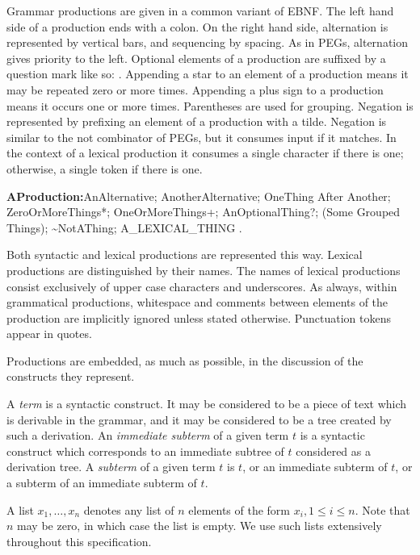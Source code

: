 \documentclass{article}
\begin{document}
\LMHash{}
Grammar productions are given in a common variant of EBNF.
The left hand side of a production ends with a colon.
On the right hand side, alternation is represented by vertical bars, and sequencing by spacing.
As in PEGs, alternation gives priority to the left.
Optional elements of a production are suffixed by a question mark like so: .
Appending a star to an element of a production means it may be repeated zero or more times.
Appending a plus sign to a production means it occurs one or more times.
Parentheses are used for grouping.
Negation is represented by prefixing an element of a production with a tilde.
Negation is similar to the not combinator of PEGs, but it consumes input if it matches.
In the context of a lexical production it consumes a single character if there is one; otherwise, a single token if there is one.


\begin{grammar}
{\sf
{\bf AProduction:}AnAlternative;
  AnotherAlternative;
  OneThing After Another;
  ZeroOrMoreThings*;
  OneOrMoreThings+;
  AnOptionalThing?;
  (Some Grouped Things);
  \~{}NotAThing;
  A\_LEXICAL\_THING
  .
}
\end{grammar}

\LMHash{}
Both syntactic and lexical productions are represented this way.
Lexical productions are distinguished by their names.
The names of lexical productions consist exclusively of upper case characters and underscores.
As always, within grammatical productions, whitespace and comments between elements of the production are implicitly ignored unless stated otherwise.
Punctuation tokens appear in quotes.

\LMHash{}
Productions are embedded, as much as possible, in the discussion of the constructs they represent.

\LMHash{}
A {\em term} is a syntactic construct.
It may be considered to be a piece of text which is derivable in the grammar,
and it may be considered to be a tree created by such a derivation.
An {\em immediate subterm} of a given term $t$ is a syntactic construct
which corresponds to an immediate subtree of $t$ considered as a derivation tree.
A {\em subterm} of a given term $t$ is $t$,
or an immediate subterm of $t$,
or a subterm of an immediate subterm of $t$.

\LMHash{}
A list $x_1, \ldots, x_n$ denotes any list of $n$ elements of the form $x_i, 1 \le i \le n$.
Note that $n$ may be zero, in which case the list is empty.
We use such lists extensively throughout this specification.
\end{document}
